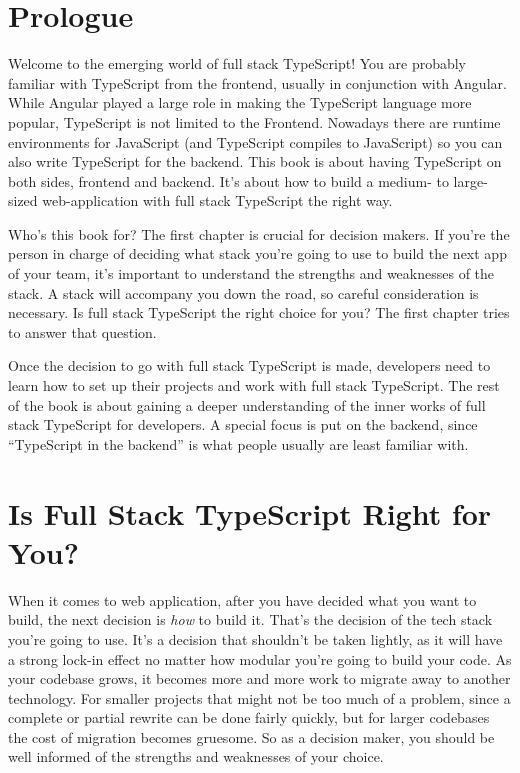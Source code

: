 \documentclass[12pt,a4paper]{report}
\begin{document}
\chapter*{Prologue}
Welcome to the emerging world of full stack TypeScript! You are probably familiar with TypeScript from the frontend, usually in conjunction with Angular. While Angular played a large role in making the TypeScript language more popular, TypeScript is not limited to the Frontend. Nowadays there are runtime environments for JavaScript (and TypeScript compiles to JavaScript) so you can also write TypeScript for the backend. This book is about having TypeScript on both sides, frontend and backend. It's about how to build a medium- to large-sized web-application with full stack TypeScript the right way.

Who's this book for? The first chapter is crucial for decision makers. If you're the person in charge of deciding what stack you're going to use to build the next app of your team, it's important to understand the strengths and weaknesses of the stack. A stack will accompany you down the road, so careful consideration is necessary. Is full stack TypeScript the right choice for you? The first chapter tries to answer that question.

Once the decision to go with full stack TypeScript is made, developers need to learn how to set up their projects and work with full stack TypeScript. The rest of the book is about gaining a deeper understanding of the inner works of full stack TypeScript for developers. A special focus is put on the backend, since ``TypeScript in the backend'' is what people usually are least familiar with.

\chapter{Is Full Stack TypeScript Right for You?}

When it comes to web application, after you have decided what you want to build, the next decision is \textit{how} to build it. That's the decision of the tech stack you're going to use. It's a decision that shouldn't be taken lightly, as it will have a strong lock-in effect no matter how modular you're going to build your code. As your codebase grows, it becomes more and more work to migrate away to another technology. For smaller projects that might not be too much of a problem, since a complete or partial rewrite can be done fairly quickly, but for larger codebases the cost of migration becomes gruesome. So as a decision maker, you should be well informed of the strengths and weaknesses of your choice.
\end{document}

